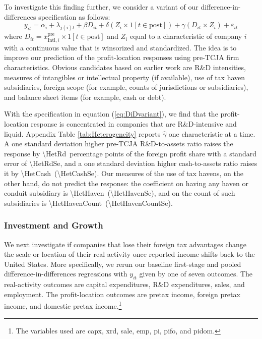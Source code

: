 \documentclass[11pt,letterpaper]{article}
\newcommand{\CoefNum}[1]{\num[round-mode=places,round-precision=3]{#1}}
\newcommand{\SENum}[1]{(\num[round-mode=places,round-precision=3]{#1})}
\begin{document}
To investigate this finding further, we consider a variant
of our difference-in-differences specification as follows:
\begin{equation}
  y_{it} =
  \alpha_i+\lambda_{j(i)t}
  +\beta D_{it} 
  +\delta (Z_i \times 1[t\in \text{post}])
  +\gamma (D_{it} \times Z_i)
  +\varepsilon_{it}
\label{eq:DiDvariant}
\end{equation}
where $D_{it}= \bar x^{\text{pre}}_{\text{Intl},i}\times 1[t\in \text{post}]$
and $Z_i$ equal to a characteristic of company $i$
with a continuous value that is winsorized and standardized.
The idea is to improve our prediction of the profit-location responses
using pre-TCJA firm characteristics.  Obvious candidates based on earlier
work are R\&D intensities, measures of intangibles or intellectual property
(if available), use of tax haven subsidiaries, foreign scope (for example, 
counts of jurisdictions or subsidiaries), and balance sheet items 
(for example, cash or debt).

With the specification in equation (\ref{eq:DiDvariant}), we find
that the profit-location response is concentrated in companies that are
R\&D-intensive and liquid. Appendix Table \ref{tab:Heterogeneity} reports
$\hat\gamma$ one characteristic at a time. A one standard deviation
higher pre-TCJA R\&D-to-assets ratio raises the response by
\CoefNum{\HetRd}\ percentage points of the foreign profit share
with a standard error of \CoefNum{\HetRdSe}, and a one standard
deviation higher cash-to-assets ratio raises it by
\CoefNum{\HetCash}\ \SENum{\HetCashSe}. Our measures of the use of tax havens, on the
other hand, do not predict the response: the coefficient on having any
haven or conduit subsidiary is \CoefNum{\HetHaven}\
\SENum{\HetHavenSe}, and on the count of such subsidiaries is
\CoefNum{\HetHavenCount}\ \SENum{\HetHavenCountSe}. 


\subsubsection{Investment and Growth\label{sec:InvestmentGrowth}}

We next investigate if companies that lose their foreign tax advantages 
change the scale or location of their real activity once
reported income shifts back to the United States.
More specifically, we rerun our baseline first-stage and pooled
difference-in-differences regressions with $y_{it}$ given by one of 
seven outcomes. The real-activity outcomes are
capital expenditures, R\&D expenditures,
sales, and employment. The profit-location outcomes are pretax
income, foreign pretax income, and domestic pretax income.\footnote{%
The \citet{CompustatAnnual} variables used are capx, xrd, sale, emp, pi, pifo, and pidom.}
\end{document}
